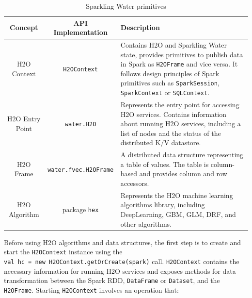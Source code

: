 \documentclass{standalone}
\begin{document}
\begin{table}[!ht]
	\centering
	\begin{tabular}{c c p{5.2cm}}
		\toprule
		Concept & API Implementation& Description \\
		\midrule
		H2O Context & \texttt{H2OContext} & Contains
		H2O and Sparkling Water state, provides primitives to publish data in Spark as \texttt{H2OFrame} and
		vice versa. It follows design principles of Spark primitives such as
		\texttt{SparkSession}, \texttt{SparkContext} or \texttt{SQLContext}. \\ \addlinespace

		H2O Entry Point & \texttt{water.H2O} & Represents the entry point for accessing
		H2O services. Contains information about running H2O services, including a list of
		nodes and the status of the distributed K/V datastore. \\  \addlinespace

		H2O Frame &  \small{\texttt{water.fvec.H2OFrame}} & A distributed data structure
		representing a table of values. The table is column-based and provides column and
		row accessors. \\  \addlinespace

		H2O Algorithm & package \texttt{hex} & Represents the H2O machine learning
		algorithms library, including DeepLearning, GBM, GLM, DRF, and other
		algorithms. \\

		\bottomrule
	\end{tabular}
	\caption{Sparkling Water primitives}
	\label{tab:primitives}
\end{table}

Before using H2O algorithms and data structures, the first step is to create and start the \texttt{H2OContext} instance using the \\
\texttt{val hc = new H2OContext.getOrCreate(spark)} call.
\texttt{H2OContext} contains the necessary information for running H2O services and exposes methods for data transformation between the Spark RDD, \texttt{DataFrame} or \texttt{Dataset}, and the \texttt{H2OFrame}.
Starting \texttt{H2OContext} involves an operation that:
\end{document}
